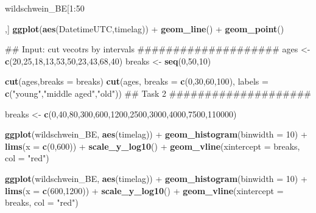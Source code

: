 \documentclass[]{book}
\newenvironment{Shaded}{\begin{snugshade}}{\end{snugshade}}
\newcommand{\KeywordTok}[1]{\textcolor[rgb]{0.13,0.29,0.53}{\textbf{{#1}}}}
\newcommand{\DataTypeTok}[1]{\textcolor[rgb]{0.13,0.29,0.53}{{#1}}}
\newcommand{\DecValTok}[1]{\textcolor[rgb]{0.00,0.00,0.81}{{#1}}}
\newcommand{\StringTok}[1]{\textcolor[rgb]{0.31,0.60,0.02}{{#1}}}
\newcommand{\NormalTok}[1]{{#1}}
\theoremstyle{definition}
\theoremstyle{definition}
\theoremstyle{definition}
\theoremstyle{remark}
\begin{document}
\begin{Shaded}
\begin{Highlighting}[]
{{{\NormalTok{wildschwein_BE[}\DecValTok{1}\NormalTok{:}\DecValTok{50}\NormalTok{,] %
\StringTok{  }\KeywordTok{ggplot}\NormalTok{(}\KeywordTok{aes}\NormalTok{(DatetimeUTC,timelag)) +}
\StringTok{  }\KeywordTok{geom_line}\NormalTok{() +}
\StringTok{  }\KeywordTok{geom_point}\NormalTok{()}


\NormalTok{## Input: cut vecotrs by intervals ####################}
\NormalTok{ages <-}\StringTok{ }\KeywordTok{c}\NormalTok{(}\DecValTok{20}\NormalTok{,}\DecValTok{25}\NormalTok{,}\DecValTok{18}\NormalTok{,}\DecValTok{13}\NormalTok{,}\DecValTok{53}\NormalTok{,}\DecValTok{50}\NormalTok{,}\DecValTok{23}\NormalTok{,}\DecValTok{43}\NormalTok{,}\DecValTok{68}\NormalTok{,}\DecValTok{40}\NormalTok{)}
\NormalTok{breaks <-}\StringTok{ }\KeywordTok{seq}\NormalTok{(}\DecValTok{0}\NormalTok{,}\DecValTok{50}\NormalTok{,}\DecValTok{10}\NormalTok{)}

\KeywordTok{cut}\NormalTok{(ages,}\DataTypeTok{breaks =} \NormalTok{breaks)}
\KeywordTok{cut}\NormalTok{(ages, }\DataTypeTok{breaks =} \KeywordTok{c}\NormalTok{(}\DecValTok{0}\NormalTok{,}\DecValTok{30}\NormalTok{,}\DecValTok{60}\NormalTok{,}\DecValTok{100}\NormalTok{), }\DataTypeTok{labels =} \KeywordTok{c}\NormalTok{(}\StringTok{"young"}\NormalTok{,}\StringTok{"middle aged"}\NormalTok{,}\StringTok{"old"}\NormalTok{))}
\NormalTok{## Task 2 ####################}

\NormalTok{breaks <-}\StringTok{ }\KeywordTok{c}\NormalTok{(}\DecValTok{0}\NormalTok{,}\DecValTok{40}\NormalTok{,}\DecValTok{80}\NormalTok{,}\DecValTok{300}\NormalTok{,}\DecValTok{600}\NormalTok{,}\DecValTok{1200}\NormalTok{,}\DecValTok{2500}\NormalTok{,}\DecValTok{3000}\NormalTok{,}\DecValTok{4000}\NormalTok{,}\DecValTok{7500}\NormalTok{,}\DecValTok{110000}\NormalTok{)}



\KeywordTok{ggplot}\NormalTok{(wildschwein_BE, }\KeywordTok{aes}\NormalTok{(timelag)) +}
\StringTok{  }\KeywordTok{geom_histogram}\NormalTok{(}\DataTypeTok{binwidth =} \DecValTok{10}\NormalTok{) +}
\StringTok{  }\KeywordTok{lims}\NormalTok{(}\DataTypeTok{x =} \KeywordTok{c}\NormalTok{(}\DecValTok{0}\NormalTok{,}\DecValTok{600}\NormalTok{)) +}
\StringTok{  }\KeywordTok{scale_y_log10}\NormalTok{() +}
\StringTok{  }\KeywordTok{geom_vline}\NormalTok{(}\DataTypeTok{xintercept =} \NormalTok{breaks, }\DataTypeTok{col =} \StringTok{"red"}\NormalTok{)}

\KeywordTok{ggplot}\NormalTok{(wildschwein_BE, }\KeywordTok{aes}\NormalTok{(timelag)) +}
\StringTok{  }\KeywordTok{geom_histogram}\NormalTok{(}\DataTypeTok{binwidth =} \DecValTok{10}\NormalTok{) +}
\StringTok{  }\KeywordTok{lims}\NormalTok{(}\DataTypeTok{x =} \KeywordTok{c}\NormalTok{(}\DecValTok{600}\NormalTok{,}\DecValTok{1200}\NormalTok{)) +}
\StringTok{  }\KeywordTok{scale_y_log10}\NormalTok{() +}
\StringTok{  }\KeywordTok{geom_vline}\NormalTok{(}\DataTypeTok{xintercept =} \NormalTok{breaks, }\DataTypeTok{col =} \StringTok{"red"}\NormalTok{)}


}}}}
\end{Highlighting}
\end{Shaded}
\end{document}
